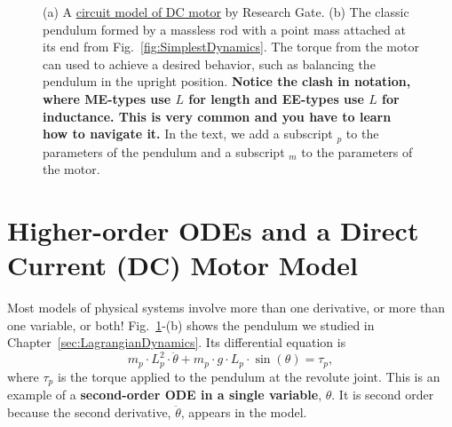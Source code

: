\begin{figure}[htb]%
\centering
{}%
\hspace{.3cm}
%
\hfill
\caption[]{(a) A \href{https://www.researchgate.net/figure/Circuit-model-of-DC-motor_fig4_338420606}{circuit model of DC motor} by Research Gate. (b) The classic pendulum formed by a massless rod with a point mass attached at its end from Fig.~\ref{fig:SimplestDynamics}. The torque from the motor can used to achieve a desired behavior, such as balancing the pendulum in the upright position. \textbf{Notice the clash in notation, where ME-types use $L$ for length and EE-types use $L$ for inductance. This is very common and you have to learn how to navigate it.} In the text, we add a subscript $_p$ to the parameters of the pendulum and a subscript $_m$ to the parameters of the motor.}
    \label{fig:DCmotorAndPendulum}
\end{figure}

\section{Higher-order ODEs and a Direct Current (DC) Motor Model}

Most models of physical systems involve more than one derivative, or more than one variable, or both! Fig.~\ref{fig:DCmotorAndPendulum}-(b) shows the pendulum we studied in Chapter~\ref{sec:LagrangianDynamics}. Its differential equation is 
\begin{equation}
\label{eq:DddotqPendulumTake02}
   m_p \cdot L_p^2 \cdot \ddot{\theta} + m_p \cdot g\cdot L_p \cdot \sin(\theta)= \tau_p,
\end{equation}
where $\tau_p$ is the torque applied to the pendulum at the revolute joint. This is an example of a \textbf{second-order ODE in a single variable}, $\theta$. It is second order because the second derivative, $\ddot{\theta}$, appears in the model.


